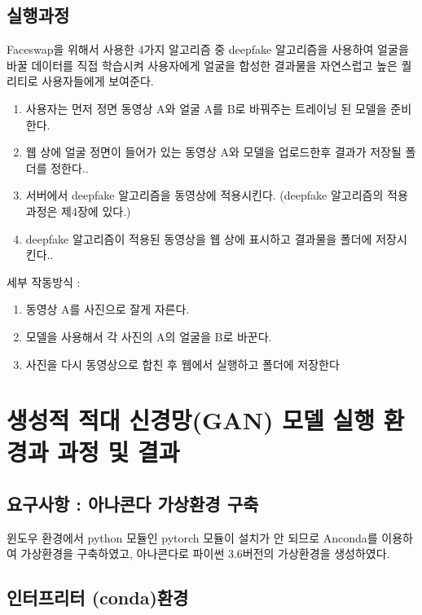 \documentclass{oblivoir}
\begin{document}
\subsection{실행과정}

Faceswap을 위해서 사용한 4가지 알고리즘 중 deepfake 알고리즘을 사용하여 얼굴을 바꿀 데이터를 직접 학습시켜 사용자에게 얼굴을 합성한 결과물을 자연스럽고 높은 퀄리티로 사용자들에게 보여준다.

\begin{enumerate}
    \item  사용자는 먼저 정면 동영상 A와 얼굴 A를 B로 바꿔주는 트레이닝 된 모델을 준비한다.
    \item 웹 상에 얼굴 정면이 들어가 있는 동영상 A와 모델을 업로드한후 결과가 저장될 폴더를 정한다..
    \item 서버에서 deepfake 알고리즘을 동영상에 적용시킨다.  (deepfake 알고리즘의 적용과정은 제4장에 있다.)
    \item deepfake 알고리즘이 적용된 동영상을 웹 상에 표시하고 결과물을 폴더에 저장시킨다..
\end{enumerate}

세부 작동방식 :

\begin{enumerate}
    \item  동영상 A를 사진으로 잘게 자른다. 
    \item  모델을 사용해서 각 사진의 A의 얼굴을 B로 바꾼다. 
    \item  사진을 다시 동영상으로 합친 후 웹에서 실행하고 폴더에 저장한다
\end{enumerate}

\section{생성적 적대 신경망(GAN) 모델 실행 환경과 과정 및 결과}

\subsection{요구사항 : 아나콘다 가상환경 구축}


윈도우 환경에서 python 모듈인 pytorch 모듈이 설치가 안 되므로 Anconda를 이용하여 가상환경을 구축하였고, 아나콘다로 파이썬 3.6버전의 가상환경을 생성하였다.

\subsection{인터프리터 (conda)환경}
\end{document}
